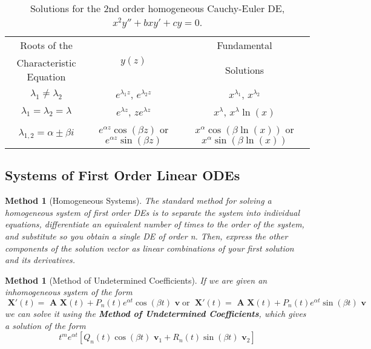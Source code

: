 \documentclass[12pt]{article}
\newtheorem{met}[thm]{Method}
\theoremstyle{definition}
\theoremstyle{remark}
\numberwithin{equation}{section}
\newcommand\B[1]{\textbf{ #1}}
\begin{document}
\bgroup
\def\arraystretch{1.5}
\begin{table}[H]
        \centering
        \caption{Solutions for the 2nd order homogeneous Cauchy-Euler DE, $x^2y''+bxy'+cy=0$.}
        \begin{tabular}{c|c|c}
                Roots of the & \multirow{2}{*}{$y(z)$} & Fundamental \\
                Characteristic Equation &  & Solutions \\ \hline
                $\lambda_1 \neq \lambda_2$ & $e^{\lambda_1 z}$, $e^{\lambda_2 z}$ & $x^{\lambda_1}$, $x^{\lambda_2}$ \\
                $\lambda_1=\lambda_2=\lambda$ & $e^{\lambda z}$, $ze^{\lambda z}$ & $x^{\lambda}$, $x^{\lambda}\ln(x)$ \\
                $\lambda_{1,2} = \alpha \pm \beta i$ & $e^{\alpha z}\cos(\beta z)$ or $e^{\alpha z}\sin(\beta z)$ & $x^{\alpha}\cos(\beta\ln(x))$ or $x^{\alpha}\sin(\beta\ln(x))$ \\
        \end{tabular}
\end{table}
\egroup

\vspace{1cm}


\subsection{Systems of First Order Linear ODEs}

\begin{met}[Homogeneous Systems]
        The standard method for solving a homogeneous system of first order DEs is to separate the system into individual equations, differentiate an equivalent number of times to the order of the system, and substitute so you obtain a single DE of order n. Then, express the other components of the solution vector as linear combinations of your first solution and its derivatives.
\end{met}



\vspace{1cm}


\begin{met}[Method of Undetermined Coefficients]
        If we are given an inhomogeneous system of the form \begin{equation}
                \B{X}'(t) = \B{A}\B{X}(t) + P_n(t)e^{\alpha t}\cos(\beta t)\B{v}\;\text{or}\;\B{X}'(t) = \B{A}\B{X}(t) + P_n(t)e^{\alpha t}\sin(\beta t)\B{v}
        \end{equation}
        we can solve it using the \B{Method of Undetermined Coefficients}, which gives a solution of the form \begin{equation}
                t^me^{\alpha t}[Q_n(t)\cos(\beta t)\B{v}_1 + R_n(t)\sin(\beta t)\B{v}_2]
        \end{equation}
\end{met}
\end{document}
